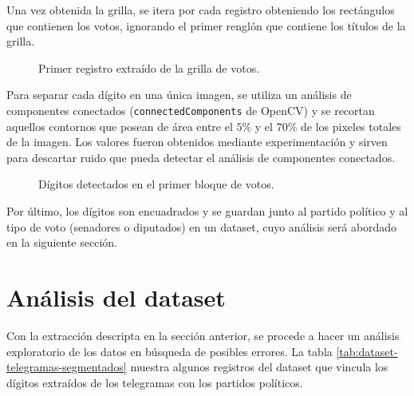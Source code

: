 Una vez obtenida la grilla, se itera por cada registro obteniendo los rect\'angulos que contienen los votos, ignorando
el primer rengl\'on que contiene los t\'itulos de la grilla.

\begin{figure}[H]
    \centering
    \caption{Primer registro extra\'ido de la grilla de votos.}
    \label{fig:etl-4-registro}
\end{figure}

Para separar cada d\'igito en una \'unica imagen, se utiliza un an\'alisis de componentes conectados
(\verb|connectedComponents| de OpenCV) y se recortan aquellos contornos que posean de \'area entre el $5\%$ y el $70\%$
de los pixeles totales de la imagen. Los valores fueron obtenidos mediante experimentaci\'on y sirven para descartar
ruido que pueda detectar el an\'alisis de componentes conectados.

\begin{figure}[H]
    \centering
    \caption{D\'igitos detectados en el primer bloque de votos.}
    \label{fig:etl-4-digitos}
\end{figure}

Por \'ultimo, los d\'igitos son encuadrados y se guardan junto al partido pol\'itico y al tipo de voto (senadores o
diputados) en un dataset, cuyo an\'alisis ser\'a abordado en la siguiente secci\'on.

\section{An\'alisis del dataset}

Con la extracci\'on descripta en la secci\'on anterior, se procede a hacer un an\'alisis exploratorio de los datos en
b\'usqueda de posibles errores. La tabla \ref{tab:dataset-telegramas-segmentados} muestra algunos registros del dataset
que vincula los d\'igitos extra\'idos de los telegramas con los partidos pol\'iticos.

